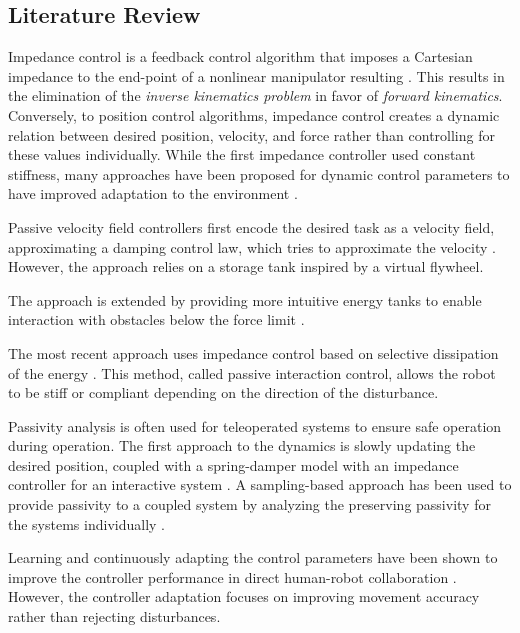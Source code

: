 \subsection{Literature Review}
\cite{takegaki1981new}
Impedance control is a feedback control algorithm that imposes a Cartesian impedance to the end-point of a nonlinear manipulator resulting \cite{hogan1985impedance}. This results in the elimination of the \textit{inverse kinematics problem} in favor of \textit{forward kinematics}.
Conversely, to position control algorithms, impedance control creates a dynamic relation between desired position, velocity, and force rather than controlling for these values individually.   
While the first impedance controller used constant stiffness, many approaches have been proposed for dynamic control parameters to have improved adaptation to the environment \cite{vanderborght2013variable, abu2020variable}. 

Passive velocity field controllers first encode the desired task as a velocity field, approximating a damping control law, which tries to approximate the velocity \cite{li1999passive,}. However, the approach relies on a storage tank inspired by a virtual flywheel.

The approach is extended by providing more intuitive energy tanks to enable interaction with obstacles below the force limit \cite{kishi2003passive}.

The most recent approach uses impedance control based on selective dissipation of the energy \cite{kronander2015passive}. This method, called passive interaction control, allows the robot to be stiff or compliant depending on the direction of the disturbance.

Passivity analysis is often used for teleoperated systems to ensure safe operation during operation.
The first approach to the dynamics is slowly updating the desired position, coupled with a spring-damper model with an impedance controller for an interactive system
\cite{lee2010passive}.
A sampling-based approach has been used to provide passivity to a coupled system by analyzing the preserving passivity for the systems individually \cite{stramigioli2005sampled}.

Learning and continuously adapting the control parameters have been shown to improve the controller performance in direct human-robot collaboration
\cite{gribovskaya2011motion}.
However, the controller adaptation focuses on improving movement accuracy rather than rejecting disturbances.

